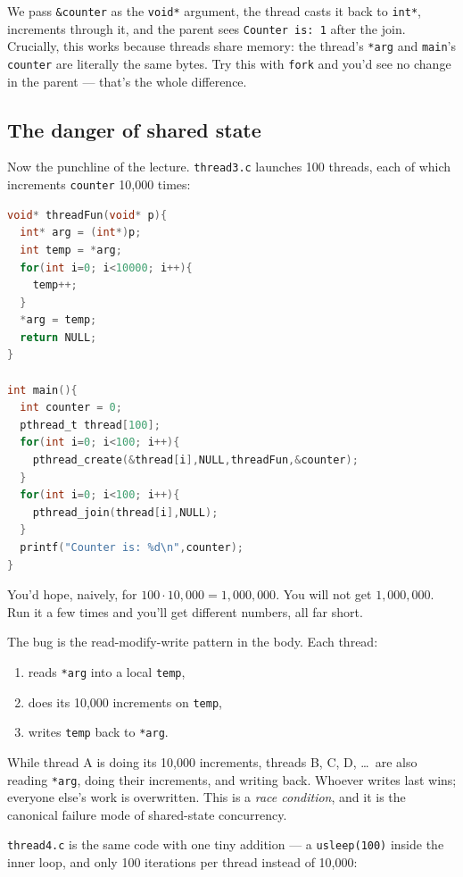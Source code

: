 \documentclass[11pt]{article}
\begin{document}
We pass \texttt{\&counter} as the \texttt{void*} argument, the thread
casts it back to \texttt{int*}, increments through it, and the parent
sees \texttt{Counter is: 1} after the join. Crucially, this works
because threads share memory: the thread's \texttt{*arg} and
\texttt{main}'s \texttt{counter} are literally the same bytes. Try
this with \texttt{fork} and you'd see no change in the parent ---
that's the whole difference.

\subsection*{The danger of shared state}

Now the punchline of the lecture. \texttt{thread3.c} launches 100
threads, each of which increments \texttt{counter} 10{,}000 times:

\begin{lstlisting}[language=C]
void* threadFun(void* p){
  int* arg = (int*)p;
  int temp = *arg;
  for(int i=0; i<10000; i++){
    temp++;
  }
  *arg = temp;
  return NULL;
}

int main(){
  int counter = 0;
  pthread_t thread[100];
  for(int i=0; i<100; i++){
    pthread_create(&thread[i],NULL,threadFun,&counter);
  }
  for(int i=0; i<100; i++){
    pthread_join(thread[i],NULL);
  }
  printf("Counter is: %d\n",counter);
}
\end{lstlisting}

You'd hope, naively, for $100 \cdot 10{,}000 = 1{,}000{,}000$. You will
not get $1{,}000{,}000$. Run it a few times and you'll get different
numbers, all far short.

The bug is the read-modify-write pattern in the body. Each thread:
\begin{enumerate}
  \item reads \texttt{*arg} into a local \texttt{temp},
  \item does its 10{,}000 increments on \texttt{temp},
  \item writes \texttt{temp} back to \texttt{*arg}.
\end{enumerate}
While thread A is doing its 10{,}000 increments, threads B, C, D,
\ldots\ are also reading \texttt{*arg}, doing their increments, and
writing back. Whoever writes last wins; everyone else's work is
overwritten. This is a \emph{race condition}, and it is the canonical
failure mode of shared-state concurrency.

\texttt{thread4.c} is the same code with one tiny addition --- a
\texttt{usleep(100)} inside the inner loop, and only 100 iterations
per thread instead of 10{,}000:
\end{document}
